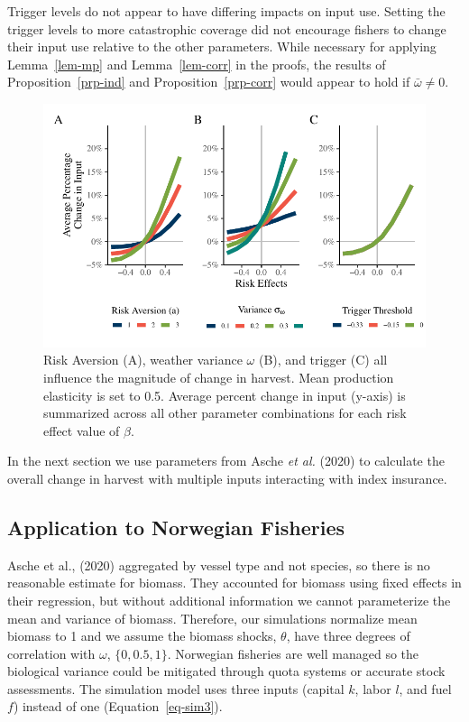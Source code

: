 \documentclass[
  letterpaper,
  DIV=11,
  numbers=noendperiod]{scrartcl}
\theoremstyle{plain}
\theoremstyle{plain}
\theoremstyle{remark}
\begin{document}
Trigger levels do not appear to have differing impacts on input use.
Setting the trigger levels to more catastrophic coverage did not
encourage fishers to change their input use relative to the other
parameters. While necessary for applying Lemma~\ref{lem-mp} and
Lemma~\ref{lem-corr} in the proofs, the results of
Proposition~\ref{prp-ind} and Proposition~\ref{prp-corr} would appear to
hold if \(\bar\omega\ne0\).

\begin{figure}

{\centering \includegraphics{ibi-behavior_files/figure-pdf/fig-sum-1.pdf}

}

\caption{\label{fig-sum}Risk Aversion (A), weather variance \(\omega\)
(B), and trigger (C) all influence the magnitude of change in harvest.
Mean production elasticity is set to 0.5. Average percent change in
input (y-axis) is summarized across all other parameter combinations for
each risk effect value of \(\beta\).}

\end{figure}

In the next section we use parameters from Asche \emph{et al.} (2020) to
calculate the overall change in harvest with multiple inputs interacting
with index insurance.

\hypertarget{application-to-norwegian-fisheries}{%
\subsection{Application to Norwegian
Fisheries}\label{application-to-norwegian-fisheries}}

Asche et al., (2020) aggregated by vessel type and not species, so there
is no reasonable estimate for biomass. They accounted for biomass using
fixed effects in their regression, but without additional information we
cannot parameterize the mean and variance of biomass. Therefore, our
simulations normalize mean biomass to 1 and we assume the biomass
shocks, \(\theta\), have three degrees of correlation with \(\omega\),
\(\{0,0.5,1\}\). Norwegian fisheries are well managed so the biological
variance could be mitigated through quota systems or accurate stock
assessments. The simulation model uses three inputs (capital \(k\),
labor \(l\), and fuel \(f\)) instead of one (Equation~\ref{eq-sim3}).
\end{document}
